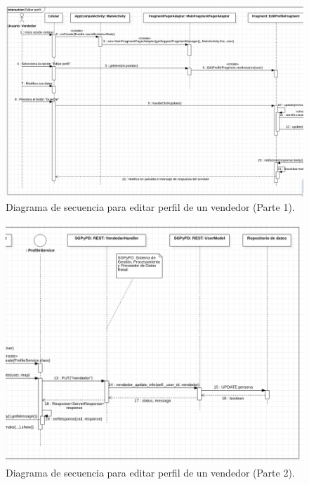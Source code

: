 \FloatBarrier
\begin{figure}[htbp!]
		\centering
			\includegraphics[width=1 \textwidth]{imagenes/adrian/vendedor/prototipo2/editar_perfil_1}
		\caption{Diagrama de secuencia para editar perfil de un vendedor (Parte 1).}
		\label{secuencia-AIPV2-perfilUno}
\end{figure}
\FloatBarrier

\FloatBarrier
\begin{figure}[htbp!]
		\centering
			\includegraphics[width=1 \textwidth]{imagenes/adrian/vendedor/prototipo2/editar_perfil_2}
		\caption{Diagrama de secuencia para editar perfil de un vendedor (Parte 2).}
		\label{secuencia-AIPV2-perfilDos}
\end{figure}
\FloatBarrier

